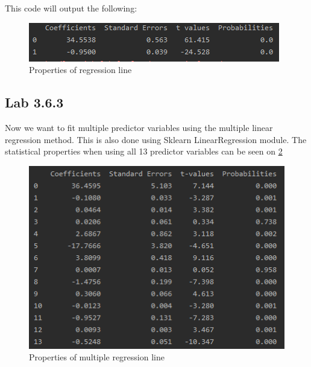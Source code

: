 This code will output the following:

\begin{figure}[H]
	\centering
	\includegraphics[width=\textwidth]{Img/lab1_output.PNG}
	\caption{Properties of regression line}
	\label{fig:lab1_1}
\end{figure} 



\subsection{Lab 3.6.3}
Now we want to fit multiple predictor variables using the multiple linear regression method. This is also done using Sklearn LinearRegression module. The statistical properties when using all 13 predictor variables can be seen on \cref{fig:lab1_2}

\begin{figure}[H]
	\centering
	\includegraphics[width=\textwidth]{Img/lab12_output.PNG}
	\caption{Properties of multiple regression line}
	\label{fig:lab1_2}
\end{figure} 

